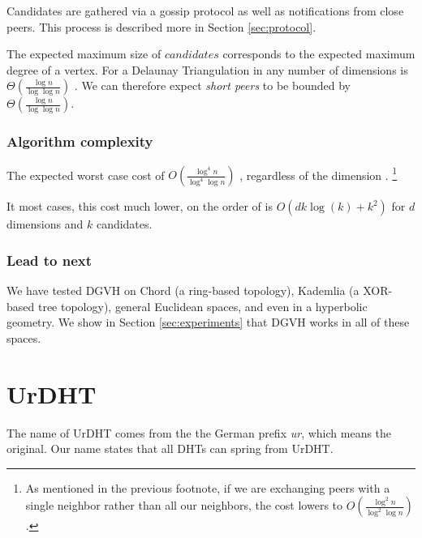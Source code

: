 \documentclass[11pt,conference]{IEEEtran}
\begin{document}
Candidates are gathered via a gossip protocol as well as notifications from close peers.
This process is described more in Section \ref{sec:protocol}.


The expected maximum size of $ candidates $ corresponds to the expected maximum degree of a vertex.
For a Delaunay Triangulation in any number of dimensions is $\Theta(\frac{\log n}{\log \log n} )$ \cite{bern1991expected}. 
We can therefore expect \textit{short peers} to be bounded by $\Theta(\frac{\log n}{\log \log n} )$.

\subsubsection*{Algorithm complexity}
The expected worst case cost of \(O(\frac{\log^{4} n}{\log^{4} \log n} )\) \cite{dgvh}, regardless of the dimension \cite{dgvh}. \footnote{As mentioned in the previous footnote, if we are exchanging peers with a single neighbor rather than all our neighbors, the cost lowers to \(O(\frac{\log^{2} n}{\log^{2} \log n} )\).}

It most cases, this cost much lower, on the order of is $ O(dk\log(k) + k^{2} ) $ for $ d $ dimensions and $ k $ candidates.

\subsubsection*{Lead to next}
We have tested DGVH on Chord (a ring-based topology), Kademlia (a XOR-based tree topology), general Euclidean spaces, and even in a hyperbolic geometry.
We show in Section \ref{sec:experiments} that DGVH works in all of these spaces.



\section{UrDHT}
\label{sec:urdht}


The name of UrDHT comes from the the German prefix \textit{ur}, which means the original. 
Our name states that all DHTs can spring from UrDHT.
\end{document}
